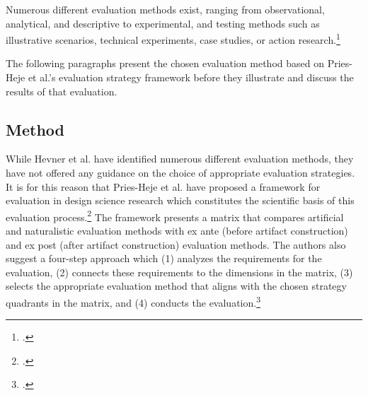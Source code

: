 
Numerous different evaluation methods exist, ranging from observational, analytical, and descriptive to experimental, and testing methods such as illustrative scenarios, technical experiments, case studies, or action research.\footcites[Cf.][p.86]{HevnerDesignScienceResearch2004}[cf.][p.4 et seq]{PfeffersDesignScienceResearch2012}

The following paragraphs present the chosen evaluation method based on Pries-Heje et al.'s evaluation strategy framework before they illustrate and discuss the results of that evaluation. 

\subsection{Method} \label{subsec:EvaluationMethod}

While Hevner et al. have identified numerous different evaluation methods, they have not offered any guidance on the choice of appropriate evaluation strategies. It is for this reason that Pries-Heje et al. have proposed a framework for evaluation in design science research which constitutes the scientific basis of this evaluation process.\footcites[Cf.][p.11 et seq]{Pries-HejeComprehensiveFrameworkEvaluation2012} The framework presents a matrix that compares artificial and naturalistic evaluation methods with ex ante (before artifact construction) and ex post (after artifact construction) evaluation methods. The authors also suggest a four-step approach which (1) analyzes the requirements for the evaluation, (2) connects these requirements to the dimensions in the matrix, (3) selects the appropriate evaluation method that aligns with the chosen strategy quadrants in the matrix, and (4) conducts the evaluation.\footcites[Cf.][p.13]{Pries-HejeComprehensiveFrameworkEvaluation2012} 

